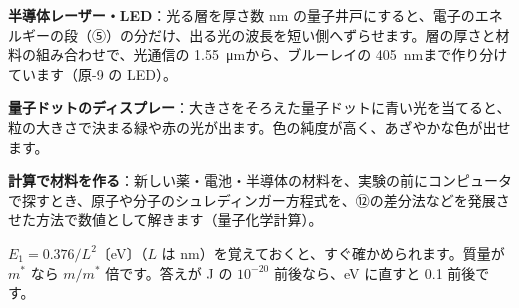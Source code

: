 \begin{phkougaku}
\textbf{半導体レーザー・LED}：光る層を厚さ数 nm の量子井戸にすると、電子のエネルギーの段（⑤）の分だけ、出る光の波長を短い側へずらせます。層の厚さと材料の組み合わせで、光通信の \qty{1.55}{\micro m}から、ブルーレイの \qty{405}{nm}まで作り分けています（原-9 の LED）。

\textbf{量子ドットのディスプレー}：大きさをそろえた量子ドットに青い光を当てると、粒の大きさで決まる緑や赤の光が出ます。色の純度が高く、あざやかな色が出せます。

\textbf{計算で材料を作る}：新しい薬・電池・半導体の材料を、実験の前にコンピュータで探すとき、原子や分子のシュレディンガー方程式を、⑫の差分法などを発展させた方法で数値として解きます（量子化学計算）。

\begin{phketa}[閉じこめのエネルギーの目安]
$E_1=0.376/L^2$〔eV〕（$L$ は nm）を覚えておくと、すぐ確かめられます。質量が $m^*$ なら $m/m^*$ 倍です。答えが J の $10^{-20}$ 前後なら、eV に直すと 0.1 前後です。
\end{phketa}
\end{phkougaku}

